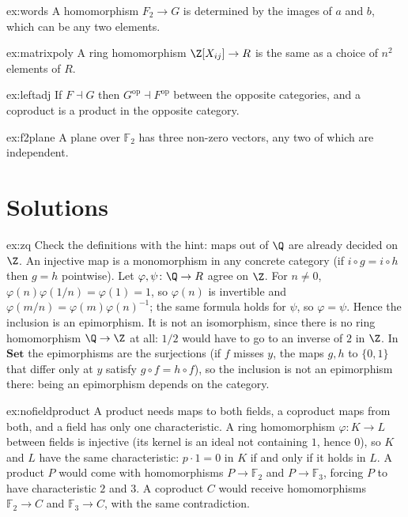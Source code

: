 \begin{hint}{ex:words}
A homomorphism $F_2\to G$ is determined by the images of $a$ and $b$, which can be any two elements.
\end{hint}

\begin{hint}{ex:matrixpoly}
A ring homomorphism $\Z[X_{ij}]\to R$ is the same as a choice of $n^2$ elements of $R$.
\end{hint}

\begin{hint}{ex:leftadj}
If $F\dashv G$ then $G^{\mathrm{op}}\dashv F^{\mathrm{op}}$ between the opposite categories, and a coproduct is a product in the opposite category.
\end{hint}

\begin{hint}{ex:f2plane}
A plane over $\mathbb F_2$ has three non-zero vectors, any two of which are independent.
\end{hint}

\section{Solutions}

\begin{solution}{ex:zq}
\idea Check the definitions with the hint: maps out of $\Q$ are already decided on $\Z$.
\writeup An injective map is a monomorphism in any concrete category (if $i\circ g=i\circ h$ then $g=h$ pointwise). Let $\varphi,\psi\colon\Q\to R$ agree on $\Z$. For $n\ne0$, $\varphi(n)\varphi(1/n)=\varphi(1)=1$, so $\varphi(n)$ is invertible and
$\varphi(m/n)=\varphi(m)\varphi(n)^{-1}$; the same formula holds for $\psi$, so $\varphi=\psi$. Hence the inclusion is an epimorphism. It is not an isomorphism, since there is no ring homomorphism $\Q\to\Z$ at all: $1/2$ would have to go to an inverse
of $2$ in $\Z$. In $\mathbf{Set}$ the epimorphisms are the surjections (if $f$ misses $y$, the maps $g,h$ to $\{0,1\}$ that differ only at $y$ satisfy $g\circ f=h\circ f$), so the inclusion is not an epimorphism there: being an epimorphism depends on the category.
\end{solution}

\begin{solution}{ex:nofieldproduct}
\idea A product needs maps to both fields, a coproduct maps from both, and a field has only one characteristic.
\writeup A ring homomorphism $\varphi\colon K\to L$ between fields is injective (its kernel is an ideal not containing $1$, hence $0$), so $K$ and $L$ have the same characteristic: $p\cdot1=0$ in $K$ if and only if it holds in $L$. A product
$P$ would come with homomorphisms $P\to\mathbb F_2$ and $P\to\mathbb F_3$, forcing $P$ to have characteristic $2$ and $3$. A coproduct $C$ would receive homomorphisms $\mathbb F_2\to C$ and $\mathbb F_3\to C$, with the same contradiction.
\end{solution}

